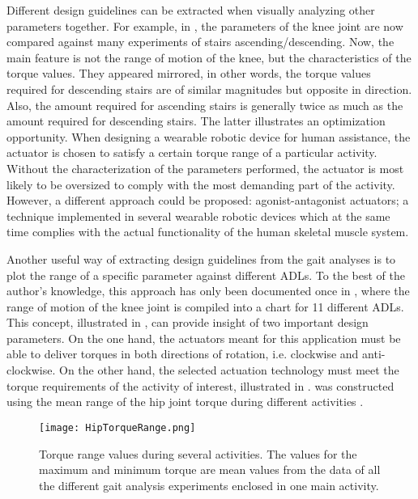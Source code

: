 Different design guidelines can be extracted when visually analyzing other parameters together. For example, in  , the parameters of the knee joint are now compared against many experiments of stairs ascending/descending. Now, the main feature is not the range of motion of the knee, but the characteristics of the torque values. They appeared mirrored, in other words, the torque values required for descending stairs are of similar magnitudes but opposite in direction. Also, the amount required for ascending stairs is generally twice as much as the amount required for descending stairs. The latter illustrates an optimization opportunity. When designing a wearable robotic device for human assistance, the actuator is chosen to satisfy a certain torque range of a particular activity. Without the characterization of the parameters performed, the actuator is most likely to be oversized to comply with the most demanding part of the activity. However, a different approach could be proposed: agonist-antagonist actuators; a technique implemented in several wearable robotic devices which at the same time complies with the actual functionality of the human skeletal muscle system.

Another useful way of extracting design guidelines from the gait analyses is to plot the range of a specific parameter against different ADLs. To the best of the author's knowledge, this approach has only been documented once in \cite{rowe2000knee}, where the range of motion of the knee joint is compiled into a chart for 11 different ADLs. This concept, illustrated in , can provide insight of two important design parameters. On the one hand, the actuators meant for this application must be able to deliver torques in both directions of rotation, i.e. clockwise and anti-clockwise. On the other hand, the selected actuation technology must meet the torque requirements of the activity of interest, illustrated in .  was constructed using the mean range of the hip joint torque during different activities \cite{bovi2011multiple,lee2008biomechanics,han2011biomechanical,protopapadaki2007hip,riener2002stair,mcintosh2006gait,roebroeck1994biomechanics,mak2003joint}.

\begin{figure}[htbp!]
    \centering
    \texttt{[image: HipTorqueRange.png]}
    \caption{Torque range values during several activities. The values for the maximum and minimum torque are mean values from the data of all the different gait analysis experiments enclosed in one main activity. \cite{bovi2011multiple,lee2008biomechanics,han2011biomechanical,protopapadaki2007hip,riener2002stair,mcintosh2006gait,roebroeck1994biomechanics,mak2003joint,solis2017characterization} }
    \label{fig:HipTorqueRange}
\end{figure}

